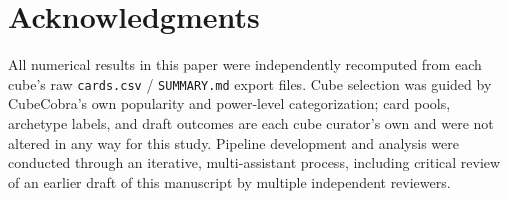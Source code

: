 \documentclass[11pt]{article}
\begin{document}
\section*{Acknowledgments}
All numerical results in this paper were independently recomputed from each
cube's raw \texttt{cards.csv} / \texttt{SUMMARY.md} export files. Cube selection
was guided by CubeCobra's own popularity and power-level categorization; card
pools, archetype labels, and draft outcomes are each cube curator's own and were
not altered in any way for this study. Pipeline development and analysis were
conducted through an iterative, multi-assistant process, including critical
review of an earlier draft of this manuscript by multiple independent reviewers.
\end{document}
